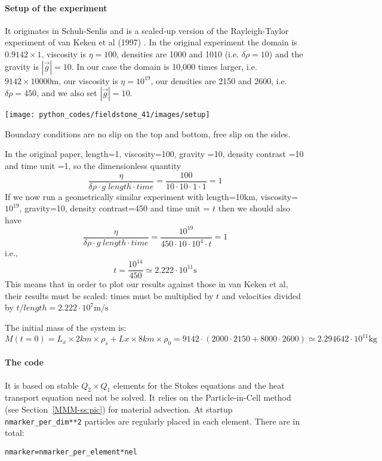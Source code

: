 
\paragraph{Setup of the experiment} It originates in Schuh-Senlis \etal \cite{sctc20} 
and is a scaled-up version of the Rayleigh-Taylor experiment of van Keken et al (1997) \cite{vaks97}.
In the original experiment the domain is $0.9142\times1$, viscosity is $\eta=100$, 
densities are 1000 and 1010 (i.e. $\delta \rho=10$) and the gravity is $|\vec{g}|=10$.
In our case the domain is 10,000 times larger, i.e. $9142\times10000$m, 
our viscosity is $\eta=10^{19}$, our densities are 2150 and 2600, i.e. $\delta\rho = 450$, 
and we also set $|\vec{g}|=10$.

\begin{center}
\texttt{[image: python\_codes/fieldstone\_41/images/setup]}
\end{center}

Boundary conditions are no slip on the top and bottom, free slip on the sides.

In the original paper, 
length=1, viscosity=100, gravity =10, density contrast =10 and time unit =1,
so the dimensionless quantity
\[
\frac{\eta}{\delta\rho \cdot g \; length \cdot time} = \frac{100}{10 \cdot 10 \cdot 1 \cdot 1} =1
\]
If we now run a geometrically similar experiment with 
length=10km, viscosity=$10^{19}$, gravity=10, density contrast=450 and time unit = $t$
then we should also have 
\[
\frac{\eta}{\delta\rho \cdot g \; length \cdot time} = \frac{10^{19}}{450 \cdot 10 \cdot 10^4 \cdot t} =1
\]
i.e.,
\[
t = \frac{10^{14}}{450} \simeq 2.222 \cdot 10^{11}\text{s}
\]
This means that in order to plot our results against those in van Keken et al, their results
must be scaled: times must be multiplied by $t$ and velocities divided by 
$t/length = 2.222 \cdot 10^{7}\text{m/s}$  

The initial mass of the system is:
\[
M(t=0) = L_x \times 2km \times \rho_s + Lx \times 8km \times \rho_0 = 
9142 \cdot(2000\cdot 2150 + 8000\cdot 2600) \simeq 2.294642\cdot 10^{11}\text{kg}
\]

\paragraph{The code} It is based on stable $Q_2\times Q_1$ elements for the Stokes equations and 
the heat transport equation need not be solved. 
It relies on the Particle-in-Cell method (see Section~\ref{MMM-ss:pic}) for material advection. 
At startup {\tt nmarker\_per\_dim**2} particles are regularly placed in each element. 
There are in total:
\begin{lstlisting}
nmarker=nmarker_per_element*nel
\end{lstlisting}

